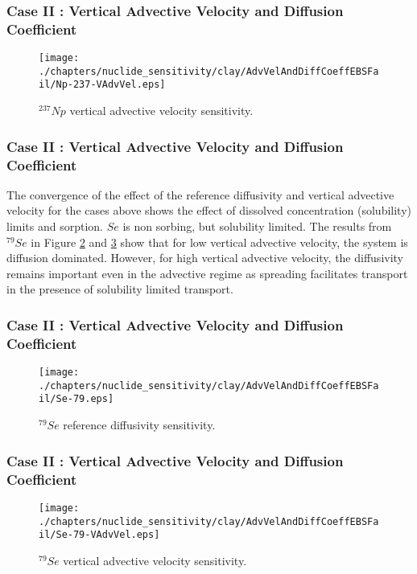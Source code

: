 
\begin{frame}[c]
  \frametitle{Case II : Vertical Advective Velocity and Diffusion Coefficient}
\begin{figure}[ht!]
\centering
\texttt{[image: ./chapters/nuclide\_sensitivity/clay/AdvVelAndDiffCoeffEBSFail/Np-237-VAdvVel.eps]}
\caption{$^{237}Np$ vertical advective velocity sensitivity.}
\label{fig:VAdvVelNp237VAdvVel}
\end{figure}
\end{frame}
  

\begin{frame}[c]
  \frametitle{Case II : Vertical Advective Velocity and Diffusion Coefficient}
The convergence of the effect of the reference diffusivity and vertical 
advective velocity for the cases above shows the effect of dissolved 
concentration (solubility) limits and sorption. $Se$ is non sorbing, but 
solubility limited.  The results from $^{79}Se$ in Figure \ref{fig:VAdvVelSe79} 
and \ref{fig:VAdvVelSe79VAdvVel} show that for low vertical advective velocity, 
the system is diffusion dominated.  However, for high vertical advective 
velocity, the diffusivity remains important even in the advective regime as 
spreading facilitates transport in the presence of solubility limited transport. 
\end{frame}

\begin{frame}[c]
  \frametitle{Case II : Vertical Advective Velocity and Diffusion Coefficient}
\begin{figure}[htp!]
\centering
\texttt{[image: ./chapters/nuclide\_sensitivity/clay/AdvVelAndDiffCoeffEBSFail/Se-79.eps]}
\caption{$^{79}Se$ reference diffusivity sensitivity.}
\label{fig:VAdvVelSe79}
\end{figure}
\end{frame}

\begin{frame}[c]
  \frametitle{Case II : Vertical Advective Velocity and Diffusion Coefficient}
\begin{figure}[ht!]
\centering
\texttt{[image: ./chapters/nuclide\_sensitivity/clay/AdvVelAndDiffCoeffEBSFail/Se-79-VAdvVel.eps]}
\caption{$^{79}Se$ vertical advective velocity sensitivity.}
\label{fig:VAdvVelSe79VAdvVel}
\end{figure}
\end{frame}

